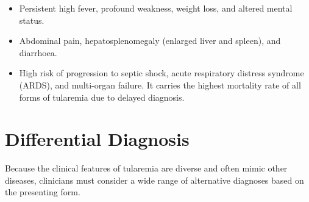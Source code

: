 \begin{itemize}
    \begin{itemize}
        \item Persistent high fever, profound weakness, weight loss, and altered mental status.
        \item Abdominal pain, hepatosplenomegaly (enlarged liver and spleen), and diarrhoea.
        \item High risk of progression to septic shock, acute respiratory distress syndrome (ARDS), and multi-organ failure. It carries the highest mortality rate of all forms of tularemia due to delayed diagnosis.
    \end{itemize}
\end{itemize}

\section*{Differential Diagnosis}
Because the clinical features of tularemia are diverse and often mimic other diseases, clinicians must consider a wide range of alternative diagnoses based on the presenting form.
